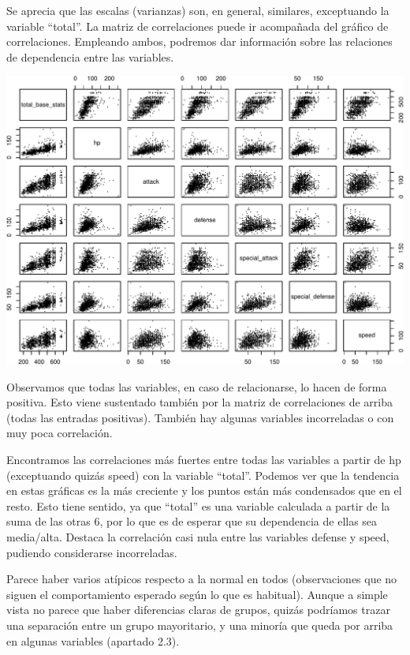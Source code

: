 \documentclass[
  11.8pt,
]{extreport}
\begin{document}
Se aprecia que las escalas (varianzas) son, en general, similares,
exceptuando la variable ``total''. La matriz de correlaciones puede ir
acompañada del gráfico de correlaciones. Empleando ambos, podremos dar
información sobre las relaciones de dependencia entre las variables.

\begin{center}
\includegraphics{trabajo_files/figure-pdf/unnamed-chunk-10-1.pdf}
\end{center}

Observamos que todas las variables, en caso de relacionarse, lo hacen de
forma positiva. Esto viene sustentado también por la matriz de
correlaciones de arriba (todas las entradas positivas). También hay
algunas variables incorreladas o con muy poca correlación.

Encontramos las correlaciones más fuertes entre todas las variables a
partir de hp (exceptuando quizás speed) con la variable ``total''.
Podemos ver que la tendencia en estas gráficas es la más creciente y los
puntos están más condensados que en el resto. Esto tiene sentido, ya que
``total'' es una variable calculada a partir de la suma de las otras 6,
por lo que es de esperar que su dependencia de ellas sea media/alta.
Destaca la correlación casi nula entre las variables defense y speed,
pudiendo considerarse incorreladas.

Parece haber varios atípicos respecto a la normal en todos
(observaciones que no siguen el comportamiento esperado según lo que es
habitual). Aunque a simple vista no parece que haber diferencias claras
de grupos, quizás podríamos trazar una separación entre un grupo
mayoritario, y una minoría que queda por arriba en algunas variables
(apartado 2.3).
\end{document}
